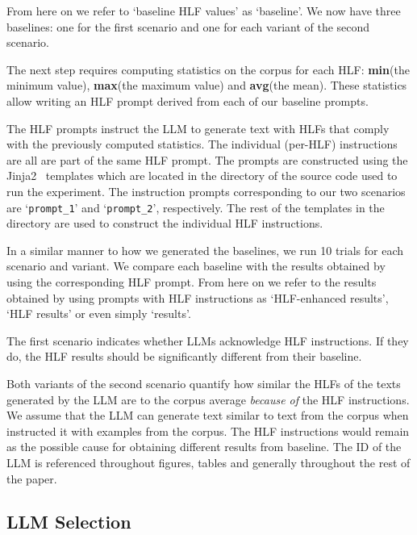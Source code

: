 \documentclass[11pt]{article}
\begin{document}
From here on we refer to `baseline HLF values' as `baseline'.
We now have three baselines: one for the first scenario and one for each variant
of the second scenario.

The next step requires computing statistics on the corpus for each HLF:
\textbf{min}(the minimum value), \textbf{max}(the maximum value) and
\textbf{avg}(the mean).
These statistics allow writing an HLF prompt derived from each of our baseline
prompts.

The HLF prompts instruct the LLM to generate text with HLFs that comply with the
previously computed statistics.
The individual (per-HLF) instructions are all are part of the same HLF prompt.
The prompts are constructed using the Jinja2~\cite{jinja2} templates which are
located in the \texttt{}
directory of the source code used to run the experiment.
The instruction prompts corresponding to our two scenarios are
`\texttt{prompt\_1}' and `\texttt{prompt\_2}', respectively.
The rest of the templates in the directory are used to construct the individual
HLF instructions.

In a similar manner to how we generated the baselines, we run 10 trials for each
scenario and variant.
We compare each baseline with the results obtained by using the corresponding
HLF prompt.
From here on we refer to the results obtained by using prompts with HLF
instructions as `HLF-enhanced results', `HLF results' or even simply `results'.

The first scenario indicates whether LLMs acknowledge HLF instructions.
If they do, the HLF results should be significantly different from their
baseline.

Both variants of the second scenario quantify how similar the HLFs of the texts
generated by the LLM are to the corpus average \textit{because of} the HLF
instructions.
We assume that the LLM can generate text similar to text from the corpus when
instructed it with examples from the corpus.
The HLF instructions would remain as the possible cause for obtaining different
results from baseline.
The ID of the LLM is referenced throughout figures, tables and generally
throughout the rest of the paper.

\subsection{LLM Selection}\label{llm-selection}
\end{document}
